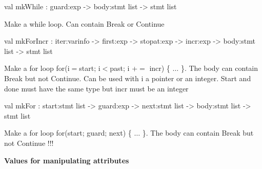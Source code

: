 \documentclass[11pt]{article}
\begin{document}
\label{val:Cil.mkWhile}\begin{ocamldoccode}
val mkWhile : guard:exp -> body:stmt list -> stmt list
\end{ocamldoccode}
\begin{ocamldocdescription}
Make a while loop. Can contain Break or Continue


\end{ocamldocdescription}




\label{val:Cil.mkForIncr}\begin{ocamldoccode}
val mkForIncr :
  iter:varinfo ->
  first:exp ->
  stopat:exp -> incr:exp -> body:stmt list -> stmt list
\end{ocamldoccode}
\begin{ocamldocdescription}
Make a for loop for(i$=$start; i$<$past; i +$=$ incr) \{ $\ldots$ \}. The body 
    can contain Break but not Continue. Can be used with i a pointer 
    or an integer. Start and done must have the same type but incr 
    must be an integer


\end{ocamldocdescription}




\label{val:Cil.mkFor}\begin{ocamldoccode}
val mkFor :
  start:stmt list ->
  guard:exp -> next:stmt list -> body:stmt list -> stmt list
\end{ocamldoccode}
\begin{ocamldocdescription}
Make a for loop for(start; guard; next) \{ $\ldots$ \}. The body can 
    contain Break but not Continue !!!


\end{ocamldocdescription}




{\bf Values for manipulating attributes}
\end{document}
